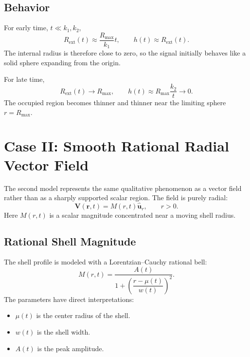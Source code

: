 \subsection{Behavior}

For early time, \(t\ll k_1,k_2\),
\[
    R_{\mathrm{ext}}(t)
    \approx
    \frac{R_{\max}}{k_1}t,
    \qquad
    h(t)\approx R_{\mathrm{ext}}(t).
\]
The internal radius is therefore close to zero, so the signal initially behaves
like a solid sphere expanding from the origin.

For late time,
\[
    R_{\mathrm{ext}}(t)\to R_{\max},
    \qquad
    h(t)\approx R_{\max}\frac{k_2}{t}\to 0.
\]
The occupied region becomes thinner and thinner near the limiting sphere
\(r=R_{\max}\).

\section{Case II: Smooth Rational Radial Vector Field}

The second model represents the same qualitative phenomenon as a vector field
rather than as a sharply supported scalar region. The field is purely radial:
\begin{equation}
    \bm{V}(\bm{r},t)
    =
    M(r,t)\hat{\bm{u}}_r,
    \qquad r>0.
    \label{eq:vector-field-general}
\end{equation}
Here \(M(r,t)\) is a scalar magnitude concentrated near a moving shell radius.

\subsection{Rational Shell Magnitude}

The shell profile is modeled with a Lorentzian--Cauchy rational bell:
\begin{equation}
    M(r,t)
    =
    \frac{A(t)}
    {1+\left(\dfrac{r-\mu(t)}{w(t)}\right)^2}.
    \label{eq:lorentzian-magnitude}
\end{equation}
The parameters have direct interpretations:
\begin{itemize}
    \item \(\mu(t)\) is the center radius of the shell.
    \item \(w(t)\) is the shell width.
    \item \(A(t)\) is the peak amplitude.
\end{itemize}

